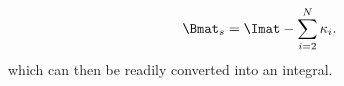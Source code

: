 \begin{equation}
\Bmat_s = \Imat - \sum\limits^{N}_{i=2} \kappa_i.
\end{equation}
which can then be readily converted into an integral.